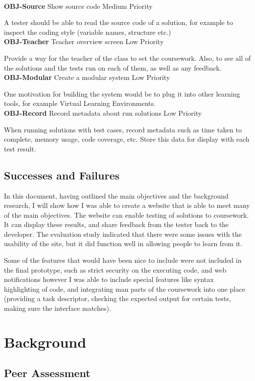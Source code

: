 \documentclass[a4paper,11pt]{report}
\newcommand{\objitem}[4]{\textbf{\\OBJ-#1} \quad #2 \hfill #3\par#4}
\begin{document}
\objitem{Source}{Show source code}{Medium Priority}{A tester should be able to read the source code of a solution, for example to inspect the coding style (variable names, structure etc.)}
\objitem{Teacher}{Teacher overview screen}{Low Priority}{Provide a way for the teacher of the class to set the coursework. Also, to see all of the solutions and the tests run on each of them, as well as any feedback.}
\objitem{Modular}{Create a modular system}{Low Priority}{One motivation for building the system would be to plug it into other learning tools, for example Virtual Learning Environments.}
\objitem{Record}{Record metadata about run solutions}{Low Priority}{When running solutions with test cases, record metadata such as time taken to complete, memory usage, code coverage, etc. Store this data for display with each test result.}

\section{Successes and Failures}
In this document, having outlined the main objectives and the background research, I will show how I was able to create a website that is able to meet many of the main objectives. The website can enable testing of solutions to coursework. It can display these results, and share feedback from the tester back to the developer. The evaluation study indicated that there were some issues with the usability of the site, but it did function well in allowing people to learn from it.\par
Some of the features that would have been nice to include were not included in the final prototype, such as strict security on the executing code, and web notifications however I was able to include special features like syntax highlighting of code, and integrating man parts of the coursework into one place (providing a task descriptor, checking the expected output for certain tests, making sure the interface matches).


\chapter{Background}
\label{ch:bg}
\section{Peer Assessment}
\end{document}
